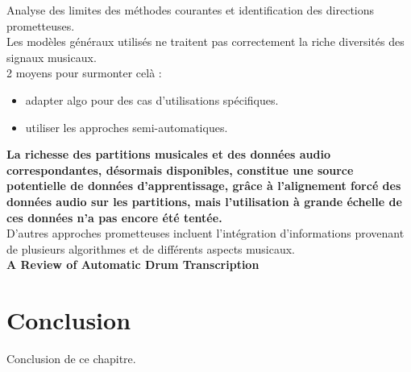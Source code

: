Analyse des limites des méthodes courantes et identification des directions prometteuses.\\
Les modèles généraux utilisés ne traitent pas correctement la riche diversités des signaux musicaux.\\
2 moyens pour surmonter celà :
\begin{itemize}
	\item adapter algo pour des cas d’utilisations spécifiques.
	\item utiliser les approches semi-automatiques.
\end{itemize}
\textbf{La richesse des partitions musicales et des données audio correspondantes, désormais disponibles, constitue une source potentielle de données d'apprentissage, grâce à l'alignement forcé des données audio sur les partitions, mais l'utilisation à grande échelle de ces données n'a pas encore été tentée.}\\
D'autres approches prometteuses incluent l'intégration
d'informations provenant de plusieurs algorithmes et de différents aspects musicaux.\\
\textbf{A Review of Automatic Drum Transcription}\cite{8350302}
\section{Conclusion}
Conclusion de ce chapitre.